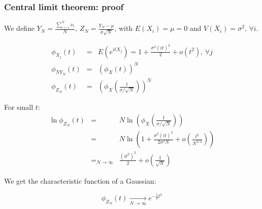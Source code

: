 \documentclass[9pt]{beamer}
\newif\ifmynote
\newcommand\mynote[1]{%
\ifmynote \textbf{#1} \else \fi
}
\begin{document}
\begin{frame}
 \frametitle{Central limit theorem: proof}
 
 \mynote{Écrire au tableau}
 
 We define $Y_N = \frac{\sum_{i=1}^N x_i}{N}$, $Z_N = \frac{Y_N - \mu}{\sigma \sqrt{N}}$, with $E(X_i) = \mu = 0$ and $V(X_i) = \sigma^2,\,\forall i$.
 
 \begin{eqnarray}
  \phi_{X_j}(t) & = & E(e^{itX_j}) = 1 + \frac{\sigma^2 (it)^2}{2} + o(t^2), \,\forall j \nonumber\\
  \phi_{NY_N}(t) & = & \left( \phi_X (t)\right)^N \nonumber\\
  \phi_{Z_N}(t) & = & \left( \phi_X \left( \frac{t}{\sigma/\sqrt{N}}\right) \right)^N \nonumber
 \end{eqnarray}
 
 For small $t$:
 \begin{eqnarray}
  \ln \phi_{Z_N}(t) & = & N \ln \left( \phi_X \left( \frac{t}{\sigma/\sqrt{N}} \right) \right)\nonumber\\
  & = & N \ln \left(1 + \frac{\sigma^2 (it)^2}{2\sigma^2 N} + o\left( \frac{t^2}{N^{3/2}} \right) \right)\nonumber\\
  & =_{N\to\infty} &  \frac{(it^2)^2}{2} + o\left( \frac{1}{\sqrt{N}}\right)
 \end{eqnarray}

 We get the characteristic function of a Gaussian:
 
 $$\phi_{Z_N} (t) \xrightarrow[N\to\infty]{} e^{-\frac{1}{2} t^2}$$

\end{frame}
\end{document}
